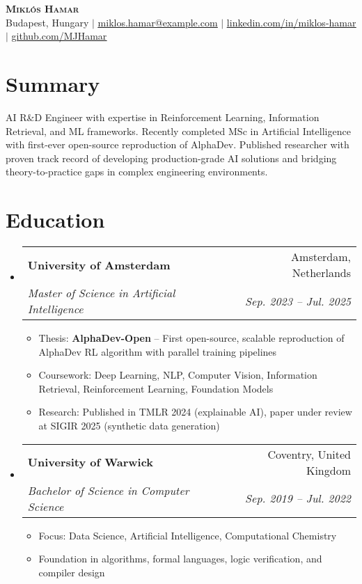 \documentclass[letterpaper,11pt]{article}
\makeatletter
\newcommand{\resumeItem}[1]{
  \item\small{
    {#1 \vspace{-2pt}}
  }
}
\newcommand{\resumeSubheading}[4]{
  \vspace{-2pt}\item
    \begin{tabular*}{0.97\textwidth}[t]{l@{\extracolsep{\fill}}r}
      \textbf{#1} & #2 \\
      \textit{\small#3} & \textit{\small #4} \\
    \end{tabular*}\vspace{-7pt}
}
\newcommand{\resumeSubHeadingListStart}{\begin{itemize}[leftmargin=0.15in, label={}]}
\newcommand{\resumeSubHeadingListEnd}{\end{itemize}}
\newcommand{\resumeItemListStart}{\begin{itemize}}
\newcommand{\resumeItemListEnd}{\end{itemize}\vspace{-5pt}}
\makeatother
\begin{document}
\begin{center}
    \textbf{\Huge \scshape Miklós Hamar} \\ \vspace{1pt}
    \small Budapest, Hungary $|$ \href{mailto:hamiki987@gmail.com}{\underline{miklos.hamar@example.com}} $|$ 
    \href{https://linkedin.com/in/miklos-hamar}{\underline{linkedin.com/in/miklos-hamar}} $|$
    \href{https://github.com/MJHamar}{\underline{github.com/MJHamar}}
\end{center}


\section{Summary}
\small{AI R\&D Engineer with expertise in Reinforcement Learning, Information Retrieval, and ML frameworks. Recently completed MSc in Artificial Intelligence with first-ever open-source reproduction of AlphaDev. Published researcher with proven track record of developing production-grade AI solutions and bridging theory-to-practice gaps in complex engineering environments.}


\section{Education}
  \resumeSubHeadingListStart
    \resumeSubheading
      {University of Amsterdam}{Amsterdam, Netherlands}
      {Master of Science in Artificial Intelligence}{Sep. 2023 -- Jul. 2025}
      \resumeItemListStart
        \resumeItem{Thesis: \textbf{AlphaDev-Open} -- First open-source, scalable reproduction of AlphaDev RL algorithm with parallel training pipelines}
        \resumeItem{Coursework: Deep Learning, NLP, Computer Vision, Information Retrieval, Reinforcement Learning, Foundation Models}
        \resumeItem{Research: Published in TMLR 2024 (explainable AI), paper under review at SIGIR 2025 (synthetic data generation)}
      \resumeItemListEnd
      
    \resumeSubheading
      {University of Warwick}{Coventry, United Kingdom}
      {Bachelor of Science in Computer Science}{Sep. 2019 -- Jul. 2022}
      \resumeItemListStart
        \resumeItem{Focus: Data Science, Artificial Intelligence, Computational Chemistry}
        \resumeItem{Foundation in algorithms, formal languages, logic verification, and compiler design}
      \resumeItemListEnd
  \resumeSubHeadingListEnd
\end{document}
